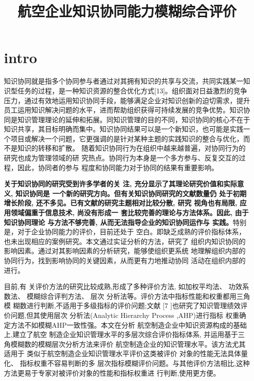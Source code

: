 \documentclass[adobefonts]{ctexart}
\begin{document}
\title{航空企业知识协同能力模糊综合评价}

\section{intro}
\label{sec:intro}

知识协同就是指多个协同参与者通过对其拥有知识的共享与交流，共同实践某一知识型任务的过程，是一种知识资源的整合优化方式[13]。组织面对日益激烈的竞争压力，通过有效地运用知识协同手段，能够满足企业对知识创新的迫切需求，提升员工运用知识解决问题的水平，进而帮助组织获得可持续发展的竞争优势。知识协同是知识管理理论的延伸和拓展。同知识管理的目的不同，知识协同的核心不在于知识共享，其目标明确而集中。知识协同结果可以是一个新知识，也可能是实践一个项目或解决一个问题，它更强调的是针对某种主题的实践知识的整合与优化，而不是知识的转移和扩散。
随着知识协同行为在组织中越来越普遍，对协同行为的研究也成为管理领域的研
究热点。协同行为本身是一个多方参与、反复交互的过程，因此，协同者的参与
程度和协同能力对于协同的结果有重要影响。

\textbf{关于知识协同的研究受到许多学者的关
注, 充分显示了其理论研究价值和实际意义, 知识协同是
一个新的研究方向。但有关知识协同研究的文献数量仍
处于初期增长阶段, 还不多见。已有文献的研究主题相对比较分散, 研究
视角也有局限, 应用领域偏重于信息技术, 尚没有形成一
套比较完善的理论与方法体系。因此, 由于知识协同理论
与方法不够完善, 从而无法指导企业的知识协同运作与
实践。}特别是，对于企业协同能力的评价，目前还处于
空白。即缺乏成熟的评价指标体系，也未出现相应的案例研究。本文通过实证分析的方法，研究了
 组织内知识协同的影响因素。通过对其影响因素的分析研究，能够使组织更系统
地理解组织内部的协同行为，找到影响协同的关键因素，从而更有力地推动协同
活动在组织内部的进行。

目前,有
关评价方法的研究比较成熟,形成了多种评价方法,
如加权平均法、 功效系数法、 模糊综合评判方法、 层次
分析法等。评价方法中指标性能和权重都用三角模
糊数进行判断,不适用于多级指标的评价问题;文献
[7 ]也研究了知识管理绩效评价问题,但其使用层次
分析法(Analytic Hierarchy Process ,AHP)进行指标
权重确定方法不如模糊AHP一致性强。本文在分析
航空制造企业中知识资源构成的基础上,建立了航空
制造企业知识管理水平的多层次综合评价指标体系,
并运用基于三角模糊数的模糊层次分析方法来评价
航空制造企业的知识管理水平。该方法尤其适用于
类似于航空制造企业知识管理水平评价这类被评价
对象的性能无法具体量化、 指标权重不容易判断的多
层次指标模糊评价问题。与其他评价方法相比,这种
方法更易于专家对被评价对象的性能和指标权重进
行判断,使用更方便。
\end{document}
